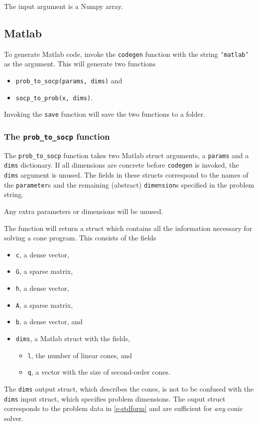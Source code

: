 \documentclass[11pt]{article}
\begin{document}
The input argument is a Numpy array.

\subsection{Matlab}
To generate Matlab code, invoke the {\tt codegen} function with the string
{\tt `matlab'} as the argument. This will generate two functions
\begin{itemize}
\item {\tt prob\_to\_socp(params, dims)} and
\item {\tt socp\_to\_prob(x, dims)}.
\end{itemize}
Invoking the {\tt save} function will save the two functions to a folder.

\subsubsection{The {\tt prob\_to\_socp} function}
The {\tt prob\_to\_socp} function takes two Matlab struct
arguments, a {\tt params} and a {\tt dims} dictionary. If all dimensions are
concrete before {\tt codegen} is invoked, the {\tt dims} argument is unused.
The fields in these
structs correspond to the names of the {\tt parameter}s and the 
remaining (abstract)
{\tt dimension}s specified in the problem string.

Any extra parameters or dimensions will be unused. 

The function will return a struct which contains all the information
necessary for solving a cone program. This consists of the fields
\begin{itemize}
  \item {\tt c}, a dense vector,
  \item {\tt G}, a sparse matrix,
  \item {\tt h}, a dense vector,
  \item {\tt A}, a sparse matrix,
  \item {\tt b}, a dense vector, and
  \item {\tt dims}, a Matlab struct with the fields,
  \begin{itemize}
    \item {\tt l}, the number of linear cones, and
    \item {\tt q}, a vector with the size of second-order cones.
  \end{itemize}
\end{itemize}
The {\tt dims} output struct, which describes the cones, 
is not to be confused with the {\tt dims} input 
struct, which specifies problem dimensions. 
The ouput struct corresponds to the problem data in \eqref{e-stdform}
and are sufficient for \emph{any} conic solver.
\end{document}

